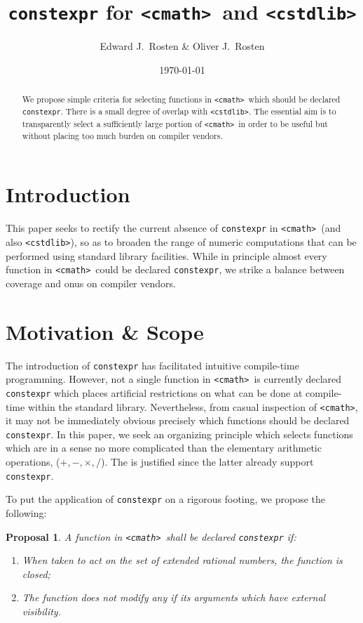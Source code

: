 \documentclass[prd,twocolumn,amsmath,amssymb,nofootinbib,eqsecnum]{revtex4-1}
\newcommand{\constexpr}{\code{constexpr}\xspace}
\newcommand{\code}[1]{{\tt #1}}
\newcommand{\header}[1]{{\tt <#1>}}
\newcommand{\cmath}{\header{cmath}}
\newcommand{\cstdlib}{\header{cstdlib}}
\newcommand{\Operators}{\ensuremath{+,-,\times,/}}
\newtheorem*{proposal*}{Proposal}
\begin{document}
\title{\constexpr for \cmath\ and \cstdlib}
\author{Edward J.~Rosten \& Oliver J.~Rosten}
\date{\today}

\begin{abstract}

We propose simple criteria for selecting functions in \cmath\ which should be
declared \constexpr. There is a small degree of overlap with \cstdlib.
 The essential aim is to transparently select a sufficiently large portion of \cmath\ 
in order to be useful but without placing too much burden on compiler vendors.
	
\end{abstract}


\maketitle

\tableofcontents

\section{Introduction}

This paper seeks to rectify the current absence of \constexpr in
\cmath\ (and also \cstdlib), so as to broaden the range of numeric computations that can be
performed using standard library facilities. While in principle almost every function
in \cmath\ could be declared \constexpr, we strike a balance between coverage and onus on compiler vendors.


\section{Motivation \& Scope}

The introduction of \constexpr has facilitated intuitive compile-time
programming. However, not a single function in \cmath\ is currently declared \constexpr which places
artificial restrictions on what can be done at compile-time within the standard library.
Nevertheless, from casual inspection of \cmath, it may
not be immediately obvious precisely which functions should be declared
\constexpr. In this paper, we seek an organizing principle which selects functions
which are in a sense no more complicated than the elementary arithmetic operations,
(\Operators). The is justified since the latter already support \constexpr.

To put the application of \constexpr on a rigorous footing, we
propose the following:
\begin{proposal*}
	A function in \cmath\ shall be declared \constexpr if:
	\begin{enumerate}
		\item When taken to act on the set of extended rational numbers, the function is closed;
		
		\item The function does not modify any if its arguments which have external visibility.
	\end{enumerate}
\end{proposal*}
\end{document}
